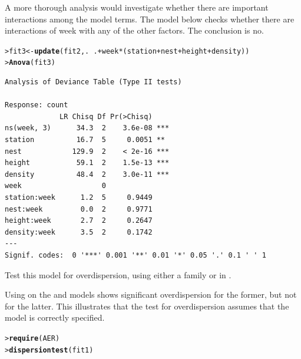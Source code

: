 \documentclass[10pt]{report}\usepackage[]{graphicx}\usepackage[]{color}
\makeatletter
\newcommand{\hlopt}[1]{\textcolor[rgb]{0,0,0}{#1}}%
\newcommand{\hlstd}[1]{\textcolor[rgb]{0.345,0.345,0.345}{#1}}%
\newcommand{\hlkwb}[1]{\textcolor[rgb]{0.69,0.353,0.396}{#1}}%
\newcommand{\hlkwd}[1]{\textcolor[rgb]{0.737,0.353,0.396}{\textbf{#1}}}%
\newenvironment{kframe}{%
 \def\at@end@of@kframe{}%
 \ifinner\ifhmode%
  \def\at@end@of@kframe{\end{minipage}}%
  \begin{minipage}{\columnwidth}%
 \fi\fi%
 \def\FrameCommand##1{\hskip\@totalleftmargin \hskip-\fboxsep
 \colorbox{shadecolor}{##1}\hskip-\fboxsep
     \hskip-\linewidth \hskip-\@totalleftmargin \hskip\columnwidth}%
 \MakeFramed {\advance\hsize-\width
   \@totalleftmargin\z@ \linewidth\hsize
   \@setminipage}}%
 {\par\unskip\endMakeFramed%
 \at@end@of@kframe}
\newenvironment{knitrout}{}{} %
\renewenvironment{knitrout}{\small\renewcommand{\baselinestretch}{.85}}{} %
\makeatother
\begin{document}
\begin{Exercises}
\begin{enumerate*}
\begin{ans}
\begin{knitrout}
\end{knitrout}
    A more thorough analysis would investigate whether there are important interactions among the model terms.
    The model below checks whether there are interactions of week with any of the other factors.
    The conclusion is no.
\begin{knitrout}\footnotesize
{}\color{fgcolor}\begin{kframe}
\begin{alltt}
\hlstd{> }\hlstd{fit3} \hlkwb{<-} \hlkwd{update}\hlstd{(fit2, .} \hlopt{~} \hlstd{.} \hlopt{+} \hlstd{week} \hlopt{*} \hlstd{(station} \hlopt{+} \hlstd{nest} \hlopt{+} \hlstd{height} \hlopt{+} \hlstd{density))}
\hlstd{> }\hlkwd{Anova}\hlstd{(fit3)}
\end{alltt}
\begin{verbatim}
Analysis of Deviance Table (Type II tests)

Response: count
             LR Chisq Df Pr(>Chisq)    
ns(week, 3)      34.3  2    3.6e-08 ***
station          16.7  5     0.0051 ** 
nest            129.9  2    < 2e-16 ***
height           59.1  2    1.5e-13 ***
density          48.4  2    3.0e-11 ***
week                   0               
station:week      1.2  5     0.9449    
nest:week         0.0  2     0.9771    
height:week       2.7  2     0.2647    
density:week      3.5  2     0.1742    
---
Signif. codes:  0 '***' 0.001 '**' 0.01 '*' 0.05 '.' 0.1 ' ' 1
\end{verbatim}
\end{kframe}
\end{knitrout}
    
		\end{ans}
		
    \item 
    \begin{sloppypar} Test this model for overdispersion, using either a  family or
     in . 
    \end{sloppypar}
    \begin{ans}
    Using  on the  and  models shows significant overdispersion for
    the former, but not for the latter.  This illustrates that the test for overdispersion
    assumes that the model is correctly specified.
\begin{knitrout}\footnotesize
{}\color{fgcolor}\begin{kframe}
\begin{alltt}
\hlstd{> }\hlkwd{require}\hlstd{(AER)}
\hlstd{> }\hlkwd{dispersiontest}\hlstd{(fit1)}
\end{alltt}
\begin{verbatim}


\end{verbatim}
\end{kframe}
\end{knitrout}
\end{ans}
\end{enumerate*}
\end{Exercises}
\end{document}
